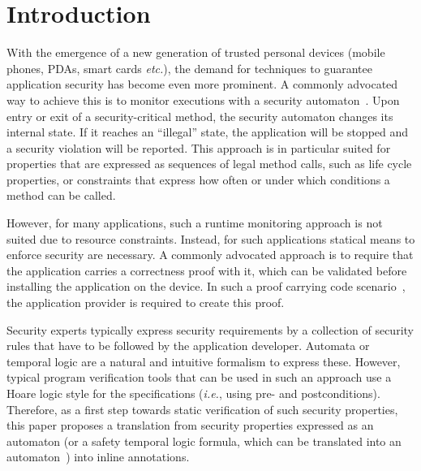 \section{Introduction}\label{SecIntro}

With the emergence of a new generation of trusted personal devices
(mobile phones, PDAs, smart cards \emph{etc.}), the demand for
techniques to guarantee application security has become even more
prominent. A commonly advocated way to achieve this is to monitor
executions with a security automaton~\cite{Schneider99}.  Upon entry
or exit of a security-critical method, the security automaton changes
its internal state. If it reaches an ``illegal'' state, the
application will be stopped and a security violation will be
reported. This approach is in particular suited for properties that
are expressed as sequences of legal method calls, such as life cycle
properties, or constraints that express how often or under which
conditions a method can be called.

However, for many applications, such a runtime monitoring approach is
not suited due to resource constraints.
Instead, for such applications
statical means to enforce security are necessary. A commonly advocated
approach is to require that the application carries a correctness
proof with it, which can be validated before installing the application
on the device. In such a proof carrying code scenario~\cite{Necula97},
the application provider is required to create this proof.

Security experts typically express security requirements by a
collection of security rules that have to be followed by the
application developer. Automata or temporal logic are a natural and
intuitive formalism to express these. However, typical program
verification tools that can be used in such an approach use a Hoare
logic style for the specifications (\emph{i.e.}, using pre- and
postconditions). Therefore, as a first step towards static
verification of such security properties, this paper proposes a
translation from security properties expressed as an automaton (or a
safety temporal logic formula, which can be translated into an
automaton~\cite{Wolper01}) into inline annotations.

